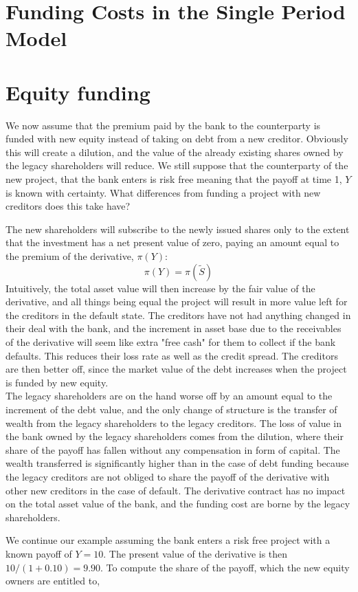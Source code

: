 \documentclass[../main.tex]{subfiles}
\begin{document}
    \section{Funding Costs in the Single Period Model}

    \section{Equity funding}
        We now assume that the premium paid by the bank to the counterparty is funded with new equity instead of taking on debt from a new creditor. Obviously this will create a dilution, and the value of the already existing shares owned by the legacy shareholders will reduce. We still suppose that the counterparty of the new project, that the bank enters is risk free meaning that the payoff at time 1, $Y$ is known with certainty. What differences from funding a project with new creditors does this take have? 

        The new shareholders will subscribe to the newly issued shares only to the extent that the investment has a net present value of zero, paying an amount equal to the premium of the derivative, $\pi(Y)$:
        \begin{equation}
            \pi(Y) = \pi(\tilde{S})
        \end{equation}
        Intuitively, the total asset value will then increase by the fair value of the derivative, and all things being equal the project will result in more value left for the creditors in the default state. The creditors have not had anything changed in their deal with the bank, and the increment in asset base due to the receivables of the derivative will seem like extra "free cash" for them to collect if the bank defaults. This reduces their loss rate as well as the credit spread. The creditors are then better off, since the market value of the debt increases when the project is funded by new equity.\\
        The legacy shareholders are on the hand worse off by an amount equal to the increment of the debt value, and the only change of structure is the transfer of wealth from the legacy shareholders to the legacy creditors. The loss of value in the bank owned by the legacy shareholders comes from the dilution, where their share of the payoff has fallen without any compensation in form of capital. The wealth transferred is significantly higher than in the case of debt funding because the legacy creditors are not obliged to share the payoff of the derivative with other new creditors in the case of default. The derivative contract has no impact on the total asset value of the bank, and the funding cost are borne by the legacy shareholders.

        We continue our example assuming the bank enters a risk free project with a known payoff of $Y=10$. The present value of the derivative is then $10/(1+0.10)=9.90$. To compute the share of the payoff, which the new equity owners are entitled to, 
\end{document}
